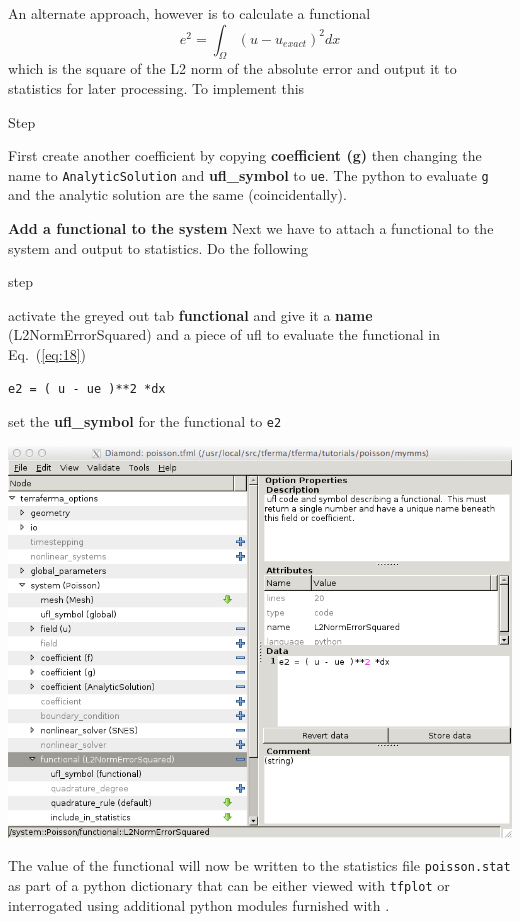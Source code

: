 An alternate approach, however is to calculate a functional
\begin{equation}
  \label{eq:18}
  e^{2} = \int_{\Omega} (u-u_{exact})^{2} dx
\end{equation}
which is the square of the L2 norm of the absolute error and output it
to statistics for later processing.  To implement this
\begin{steps}{Step}
\item First create another coefficient by copying \textbf{coefficient (g)} then changing the name to \texttt{AnalyticSolution} and \textbf{ufl\_symbol} to \texttt{ue}.  The python to evaluate \texttt{g} and the analytic solution are the same (coincidentally).
\item \textbf{Add a functional to the system} Next we have to attach a
  functional to the system  and output to statistics.  Do the following
  \begin{steps}{step}
  \item activate the greyed out tab \textbf{functional} and give it a \textbf{name} (L2NormErrorSquared) and a piece of ufl to evaluate the functional in Eq.\ (\ref{eq:18})
    \begin{lstlisting}[style=UFL]
e2 = ( u - ue )**2 *dx
    \end{lstlisting}
  \item set the  \textbf{ufl\_symbol} for the functional to \texttt{e2}
  \end{steps}
\end{steps}
\begin{center}
    \includegraphics[width=\diamondwidth]{figures/screendumps/diamond_poisson_mms_functional.png}
\end{center}
The value of the functional will now be written to the statistics file
\texttt{poisson.stat} as part of a python dictionary that can be
either viewed with \texttt{tfplot} or interrogated using additional
python modules furnished with \TF{}.

